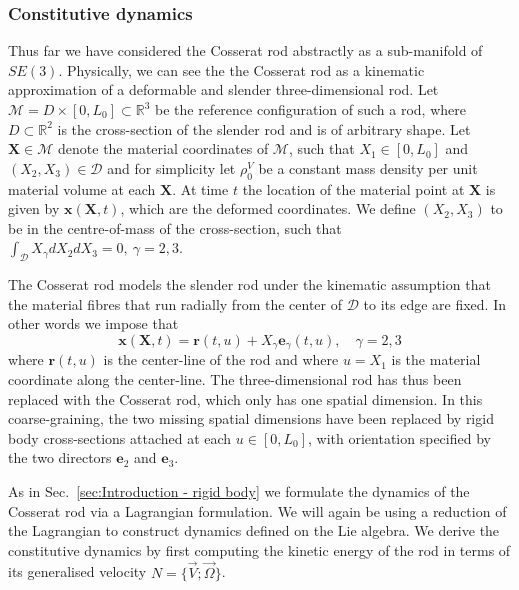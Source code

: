 \subsubsection*{Constitutive dynamics} \label{sec:Cosserat rod constitutive dynamics}

Thus far we have considered the Cosserat rod abstractly as a sub-manifold of $SE(3)$. Physically, we can see the the Cosserat rod as a kinematic approximation of a deformable and slender three-dimensional rod. Let $\mathcal{M} = D \times [0, L_0] \subset \mathbb{R}^3$ be the reference configuration of such a rod, where $D \subset \mathbb{R}^2$ is the cross-section of the slender rod and is of arbitrary shape. Let $\mathbf{X} \in \mathcal{M}$ denote the material coordinates of $\mathcal{M}$, such that $X_1 \in [0, L_0]$ and $(X_2, X_3) \in \mathscr{D}$ and for simplicity let $\rho^V_0$ be a constant mass density per unit material volume at each $\mathbf{X}$. At time $t$ the location of the material point at $\mathbf{X}$ is given by $\mathbf{x}(\mathbf{X}, t)$, which are the deformed coordinates. We define $(X_2, X_3)$ to be in the centre-of-mass of the cross-section, such that $\int_{\mathscr{D}} X_\gamma d X_2 d X_3 = 0,\ \gamma = 2,3$.

The Cosserat rod models the slender rod under the kinematic assumption that the material fibres that run radially from the center of $\mathcal{D}$ to its edge are fixed. In other words we impose that
\begin{equation} \label{eq:cosserat rod kinematic assumption}
\mathbf{x}(\mathbf{X}, t) = \mathbf{r}(t, u) + X_\gamma \mathbf{e}_\gamma(t, u), \quad \gamma = 2,3
\end{equation}
where $\mathbf{r}(t, u)$ is the center-line of the rod and where $u = X_1$ is the material coordinate along the center-line. The three-dimensional rod has thus been replaced with the Cosserat rod, which only has one spatial dimension. In this coarse-graining, the two missing spatial dimensions have been replaced by rigid body cross-sections attached at each $u \in [0, L_0]$, with orientation specified by the two directors $\mathbf{e}_2$ and $\mathbf{e}_3$.

As in Sec.~\ref{sec:Introduction - rigid body} we formulate the dynamics of the Cosserat rod via a Lagrangian formulation. We will again be using a reduction of the Lagrangian to construct dynamics defined on the Lie algebra. We derive the constitutive dynamics by first computing the kinetic energy of the rod in terms of its generalised velocity $N = \{ \vec{V} ; \vec{\Omega} \}$.

